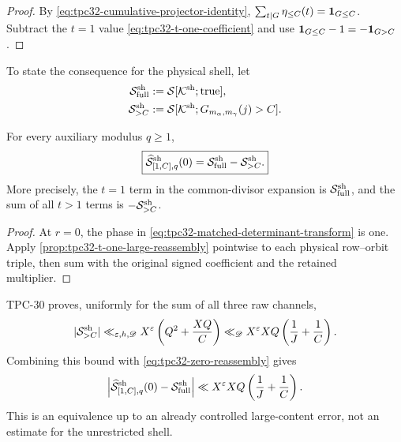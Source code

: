 \begin{proof}
By \eqref{eq:tpc32-cumulative-projector-identity},
\(\sum_{t\mid G}\eta_{\le C}(t)=\mathbf 1_{G\le C}\).  Subtract the
\(t=1\) value \eqref{eq:tpc32-t-one-coefficient} and use
\(\mathbf 1_{G\le C}-1=-\mathbf 1_{G>C}\).
\end{proof}

To state the consequence for the physical shell, let
\begin{align}
 \mathcal S_{\mathrm{full}}^{\mathrm{sh}}
 &:={}
 \mathcal S[\mathcal K^{\mathrm{sh}};\textup{true}],
 \label{eq:tpc32-full-raw-shell}\\
 \mathcal S_{>C}^{\mathrm{sh}}
 &:={}
 \mathcal S[\mathcal K^{\mathrm{sh}};G_{m_\alpha,m_\gamma}(j)>C].
 \label{eq:tpc32-large-content-raw-shell}
\end{align}

\begin{corollary}
\label{cor:tpc32-zero-reassembly}
For every auxiliary modulus \(q\ge1\),
\begin{equation}
 \boxed{
 \widehat{\mathcal S}^{\mathrm{sh}}_{[1,C],q}(0)
 =\mathcal S_{\mathrm{full}}^{\mathrm{sh}}
  -\mathcal S_{>C}^{\mathrm{sh}}.}
 \label{eq:tpc32-zero-reassembly}
\end{equation}
More precisely, the \(t=1\) term in the common-divisor expansion is
\(\mathcal S_{\mathrm{full}}^{\mathrm{sh}}\), and the sum of all \(t>1\)
terms is \(-\mathcal S_{>C}^{\mathrm{sh}}\).
\end{corollary}

\begin{proof}
At \(r=0\), the phase in
\eqref{eq:tpc32-matched-determinant-transform} is one.  Apply
\cref{prop:tpc32-t-one-large-reassembly} pointwise to each physical
row--orbit triple, then sum with the original signed coefficient and
the retained multiplier.
\end{proof}

TPC-30 proves, uniformly for the sum of all three raw channels,
\begin{equation}
 |\mathcal S_{>C}^{\mathrm{sh}}|
 \ll_{\varepsilon,h,\mathscr D}
 X^\varepsilon\left(Q^2+\frac{XQ}{C}\right)
 \ll_{\mathscr D}X^\varepsilon XQ
 \left(\frac1J+\frac1C\right).
 \label{eq:tpc32-inherited-large-content-bound}
\end{equation}
Combining this bound with
\eqref{eq:tpc32-zero-reassembly} gives
\begin{equation}
 \left|
 \widehat{\mathcal S}^{\mathrm{sh}}_{[1,C],q}(0)
 -\mathcal S_{\mathrm{full}}^{\mathrm{sh}}
 \right|
 \ll X^\varepsilon XQ\left(\frac1J+\frac1C\right).
 \label{eq:tpc32-zero-full-equivalence}
\end{equation}
This is an equivalence up to an already controlled large-content
error, not an estimate for the unrestricted shell.


